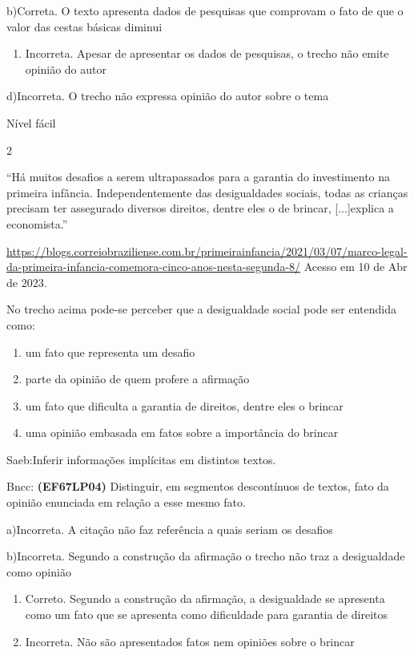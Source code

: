 {b)Correta. O texto apresenta dados de pesquisas que comprovam o fato de
que o valor das cestas básicas diminui

\begin{enumerate}
\def\labelenumi{\arabic{enumi}.}
\tightlist
\item
  Incorreta. Apesar de apresentar os dados de pesquisas, o trecho não
  emite opinião do autor
\end{enumerate}

d)Incorreta. O trecho não expressa opinião do autor sobre o tema

Nível fácil

\num{2}

``Há muitos desafios a serem ultrapassados para a garantia do
investimento na primeira infância. Independentemente das desigualdades
sociais, todas as crianças precisam ter assegurado diversos direitos,
dentre eles o de brincar, {[}...{]}explica a economista.''

\href{https://blogs.correiobraziliense.com.br/primeirainfancia/2021/03/07/marco-legal-da-primeira-infancia-comemora-cinco-anos-nesta-segunda-8/}{\uline{https://blogs.correiobraziliense.com.br/primeirainfancia/2021/03/07/marco-legal-da-primeira-infancia-comemora-cinco-anos-nesta-segunda-8/}}
Acesso em 10 de Abr de 2023.

No trecho acima pode-se perceber que a desigualdade social pode ser
entendida como:

\begin{enumerate}
\def\labelenumi{\alph{enumi})}
\item
  um fato que representa um desafio
\item
  parte da opinião de quem profere a afirmação
\item
  um fato que dificulta a garantia de direitos, dentre eles o brincar
\item
  uma opinião embasada em fatos sobre a importância do brincar
\end{enumerate}

Saeb:Inferir informações implícitas em distintos textos.

Bncc: \textbf{(EF67LP04)} Distinguir, em segmentos descontínuos de
textos, fato da opinião enunciada em relação a esse mesmo fato.

a)Incorreta. A citação não faz referência a quais seriam os desafios

b)Incorreta. Segundo a construção da afirmação o trecho não traz a
desigualdade como opinião

\begin{enumerate}
\def\labelenumi{\arabic{enumi}.}
\item
  Correto. Segundo a construção da afirmação, a desigualdade se
  apresenta como um fato que se apresenta como dificuldade para garantia
  de direitos
\item
  Incorreta. Não são apresentados fatos nem opiniões sobre o brincar
\end{enumerate}

}
